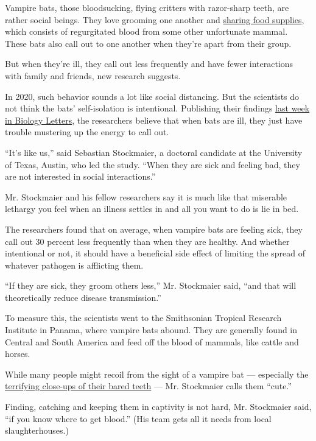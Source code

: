 Vampire bats, those bloodsucking, flying critters with razor-sharp
teeth, are rather social beings. They love grooming one another and
\href{https://www.nytimes.com/2020/03/19/science/vampire-bats-blood.html}{sharing
food supplies}, which consists of regurgitated blood from some other
unfortunate mammal. These bats also call out to one another when they're
apart from their group.

But when they're ill, they call out less frequently and have fewer
interactions with family and friends, new research suggests.

In 2020, such behavior sounds a lot like social distancing. But the
scientists do not think the bats' self-isolation is intentional.
Publishing their findings
\href{https://royalsocietypublishing.org/doi/10.1098/rsbl.2020.0272}{last
week in Biology Letters}, the researchers believe that when bats are
ill, they just have trouble mustering up the energy to call out.

``It's like us,'' said Sebastian Stockmaier, a doctoral candidate at the
University of Texas, Austin, who led the study. ``When they are sick and
feeling bad, they are not interested in social interactions.''

Mr. Stockmaier and his fellow researchers say it is much like that
miserable lethargy you feel when an illness settles in and all you want
to do is lie in bed.

The researchers found that on average, when vampire bats are feeling
sick, they call out 30 percent less frequently than when they are
healthy. And whether intentional or not, it should have a beneficial
side effect of limiting the spread of whatever pathogen is afflicting
them.

``If they are sick, they groom others less,'' Mr. Stockmaier said, ``and
that will theoretically reduce disease transmission.''

To measure this, the scientists went to the Smithsonian Tropical
Research Institute in Panama, where vampire bats abound. They are
generally found in Central and South America and feed off the blood of
mammals, like cattle and horses.

While many people might recoil from the sight of a vampire bat ---
especially the
\href{https://www.nytimes.com/2016/11/01/science/fangs.html}{terrifying
close-ups of their bared teeth} --- Mr. Stockmaier calls them ``cute.''

Finding, catching and keeping them in captivity is not hard, Mr.
Stockmaier said, ``if you know where to get blood.'' (His team gets all
it needs from local slaughterhouses.)

